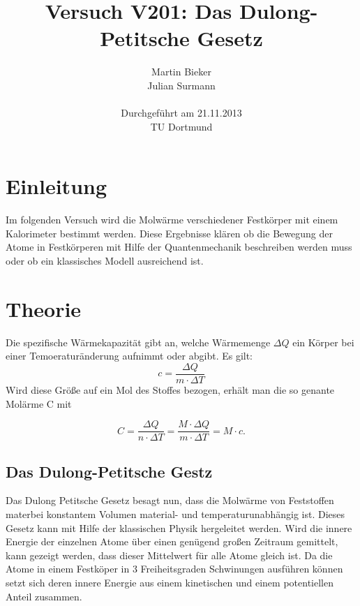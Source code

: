 \documentclass[11pt,ngerman,a4paper]{article}
\title{\textbf{Versuch V201: Das Dulong-Petitsche Gesetz}}
\author{Martin Bieker\\
		Julian Surmann\\
		\\
		Durchgef\"{u}hrt am 21.11.2013\\
		TU Dortmund}
\date{}
\begin{document}
\renewcommand\tablename{Tabelle}
\renewcommand\figurename{Abbildung}
\maketitle
\thispagestyle{empty}
\newpage
\clearpage
\setcounter{page}{1}


\section{Einleitung}

Im folgenden Versuch wird die Molw\"arme verschiedener Festk\"orper mit einem Kalorimeter bestimmt werden.  Diese Ergebnisse kl\"aren ob die Bewegung der Atome in Festk\"orperen mit Hilfe der Quantenmechanik beschreiben werden muss oder ob ein klassisches Modell ausreichend ist.
\section{Theorie}

Die spezifische W\"armekapazit\"at gibt an, welche W\"armemenge $\Delta Q$ ein K\"orper bei einer Temoeratur\"anderung aufnimmt oder abgibt. Es gilt:
\begin{equation}
c = \frac{\Delta Q}{m \cdot\Delta T}
\end{equation}
Wird diese Gr\"o\ss e auf ein Mol des Stoffes bezogen, erh\"alt man die so genante Mol\"arme C mit 

\begin{equation}
\label{c_w}
C = \frac{\Delta Q }{n\cdot \Delta T} =\frac{M\cdot \Delta Q}{m\cdot \Delta T} = M  \cdot c.
\end{equation}
\subsection{Das Dulong-Petitsche Gestz}
Das Dulong Petitsche Gesetz besagt nun, dass die Molw\"arme von Feststoffen materbei konstantem Volumen material- und temperaturunabh\"angig ist. Dieses Gesetz kann mit Hilfe der klassischen Physik hergeleitet werden.
Wird die innere Energie der einzelnen Atome \"uber einen gen\"ugend gro\ss en Zeitraum gemittelt, kann gezeigt werden, dass dieser Mittelwert f\"ur alle Atome gleich ist. Da die Atome in einem Festk\"oper in 3 Freiheitsgraden Schwinungen ausf\"uhren k\"onnen setzt sich deren innere Energie aus einem kinetischen und einem potentiellen Anteil zusammen.
\end{document}
